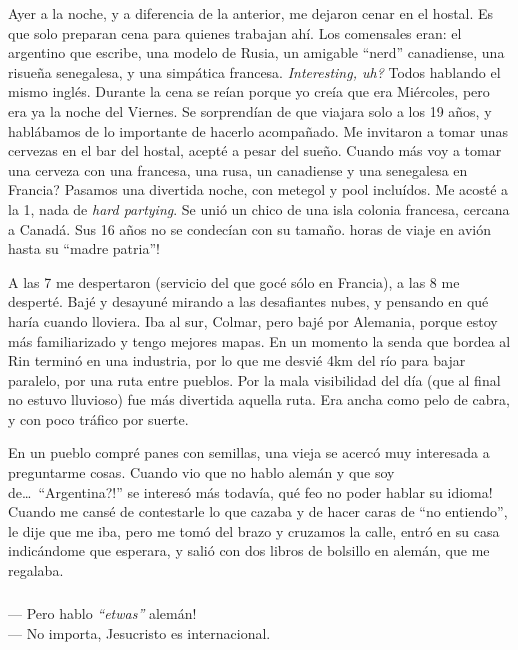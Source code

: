 Ayer a la noche, y a diferencia de la anterior, me dejaron cenar en el hostal.
Es que solo preparan cena para quienes trabajan ah\'i. Los comensales eran:
el argentino que escribe, una modelo de Rusia, un amigable ``nerd''
canadiense, una risue\~na senegalesa, y una simp\'atica francesa.
\emph{Interesting, uh?} Todos hablando el mismo ingl\'es. Durante la cena se
re\'ian porque yo cre\'ia que era Mi\'ercoles, pero era ya la noche del
Viernes. Se sorprend\'ian de que viajara solo a los 19 a\~nos, y habl\'abamos de
lo importante de hacerlo acompa\~nado. Me invitaron a tomar unas cervezas en el
bar del hostal, acept\'e a pesar del sue\~no. \textquestiondown Cuando m\'as
voy a tomar una cerveza con una francesa, una rusa, un canadiense y una
senegalesa en Francia? Pasamos una divertida noche, con metegol y pool
inclu\'idos. Me acost\'e a la 1, nada de \emph{hard partying}. Se uni\'o un
chico de una isla colonia francesa, cercana a Canad\'a. Sus 16 a\~nos no se
condec\'ian con su tama\~no.  horas de viaje en avi\'on
hasta su ``madre patria''!

A las 7 me despertaron (servicio del que goc\'e s\'olo en Francia), a las 8 me
despert\'e. Baj\'e y desayun\'e mirando a las desafiantes nubes, y pensando en
qu\'e har\'ia cuando lloviera. Iba al sur, Colmar, pero baj\'e por Alemania,
porque estoy m\'as familiarizado y tengo mejores mapas. En un momento la senda
que bordea al Rin termin\'o en una industria, por lo que me desvi\'e 4km del
r\'io para bajar paralelo, por una ruta entre pueblos. Por la mala visibilidad
del d\'ia (que al final no estuvo lluvioso) fue m\'as divertida aquella ruta.
Era ancha como pelo de cabra, y con poco tr\'afico por suerte.

En un pueblo compr\'e panes con semillas, una vieja se acerc\'o muy interesada
a preguntarme cosas. Cuando vio que no hablo alem\'an y que soy de\ldots\
``\textexclamdown \textquestiondown Argentina?!'' se interes\'o m\'as
todav\'ia, \textexclamdown qu\'e feo no poder hablar su idioma! Cuando me
cans\'e de contestarle lo que cazaba y de hacer caras de ``no entiendo'', le
dije que me iba, pero me tom\'o del brazo y cruzamos la calle, entr\'o en su
casa indic\'andome que esperara, y sali\'o con dos libros de bolsillo en
alem\'an, que me regalaba.

\subparagraph{}\label{ssub:noHabloAleman} --- \textexclamdown Pero hablo
\emph{``etwas''} alem\'an!\\ --- No importa, Jesucristo es internacional.\\
\hangindent=1cm


